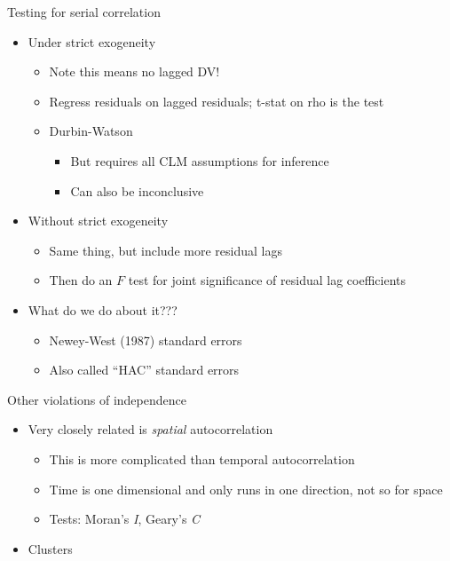 \documentclass[
  ignorenonframetext,
]{beamer}
\providecommand{\tightlist}{%
  \setlength{\itemsep}{0pt}\setlength{\parskip}{0pt}}
\newcommand{\setsep}{\setlength{\itemsep}{3pt}}
\newcommand{\setskip}{\setlength{\parskip}{3pt}}
\renewcommand{\tightlist}{\setsep\setskip}
\begin{document}
\begin{frame}{Testing for serial correlation}
\label{testing-for-serial-correlation}
\begin{itemize}[<+->]
\tightlist
\item
  Under strict exogeneity

  \begin{itemize}[<+->]
  \tightlist
  \item
    Note this means no lagged DV!
  \item
    Regress residuals on lagged residuals; t-stat on rho is the test
  \item
    Durbin-Watson

    \begin{itemize}[<+->]
    \tightlist
    \item
      But requires all CLM assumptions for inference
    \item
      Can also be inconclusive
    \end{itemize}
  \end{itemize}
\item
  Without strict exogeneity

  \begin{itemize}[<+->]
  \tightlist
  \item
    Same thing, but include more residual lags
  \item
    Then do an \(F\) test for joint significance of residual lag coefficients
  \end{itemize}
\item
  What do we do about it???

  \begin{itemize}[<+->]
  \tightlist
  \item
    Newey-West (1987) standard errors
  \item
    Also called ``HAC'' standard errors
  \end{itemize}
\end{itemize}
\end{frame}

\begin{frame}{Other violations of independence}
\label{other-violations-of-independence}
\pause

\begin{itemize}[<+->]
\tightlist
\item
  Very closely related is \emph{spatial} autocorrelation

  \begin{itemize}[<+->]
  \tightlist
  \item
    This is more complicated than temporal autocorrelation
  \item
    Time is one dimensional and only runs in one direction, not so for space
  \item
    Tests: Moran's \emph{I}, Geary's \emph{C}
  \end{itemize}
\item
  Clusters
\end{itemize}
\end{frame}
\end{document}
